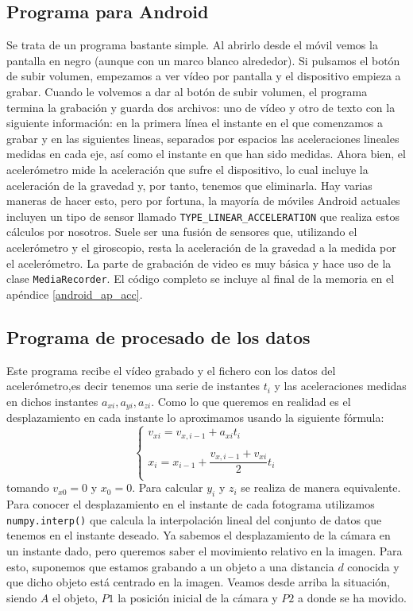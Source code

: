 \documentclass[a4paper,openright, 12pt]{book}
\begin{document}
\subsection{Programa para Android}
Se trata de un programa bastante simple. Al abrirlo desde el móvil vemos la pantalla en negro (aunque con un marco blanco alrededor). Si pulsamos el botón de subir volumen, empezamos a ver vídeo por pantalla y el dispositivo empieza a grabar. Cuando le volvemos a dar al botón de subir volumen, el programa termina la grabación y guarda dos archivos: uno de vídeo y otro de texto con la siguiente información: en la primera línea el instante en el que comenzamos a grabar y en las siguientes lineas, separados por espacios las aceleraciones lineales medidas en cada eje, así como el instante en que han sido medidas.
Ahora bien, el acelerómetro mide la aceleración que sufre el dispositivo, lo cual incluye la aceleración de la gravedad y, por tanto, tenemos que eliminarla. Hay varias maneras de hacer esto, pero por fortuna, la mayoría de móviles Android actuales incluyen un tipo de sensor llamado \lstinline|TYPE_LINEAR_ACCELERATION| que realiza estos cálculos por nosotros. Suele ser una fusión de sensores que, utilizando el acelerómetro y el giroscopio, resta la aceleración de la gravedad a la medida por el acelerómetro.
La parte de grabación de video es muy básica y hace uso de la clase \lstinline|MediaRecorder|.
El código completo se incluye al final de la memoria en el apéndice \ref{android_ap_acc}.
\newpage
\subsection{Programa de procesado de los datos}
Este programa recibe el vídeo grabado y el fichero con los datos del acelerómetro,es decir tenemos una serie de instantes $t_i$ y las aceleraciones medidas en dichos instantes $a_{xi}, a_{yi}, a_{zi}$.
Como lo que queremos en realidad es el desplazamiento en cada instante lo aproximamos usando la siguiente fórmula:
\begin{equation}
\left\{ \begin{array}{lcc}
             v_{xi} = v_{x,i-1} + a_{xi}t_i \\
             \\ x_i = x_{i-1} + \dfrac{v_{x,i-1} + v_{xi}}{2} t_i \\
             \end{array}
   \right.
\end{equation}
tomando $v_{x0}=0$ y $x_0=0$.
Para calcular $y_i$ y $z_i$ se realiza de manera equivalente.
\newline
Para conocer el desplazamiento en el instante de cada fotograma utilizamos \lstinline|numpy.interp()| que calcula la interpolación lineal del conjunto de datos que tenemos en el instante deseado. Ya sabemos el desplazamiento de la cámara en un instante dado, pero queremos saber el movimiento relativo en la imagen. Para esto, suponemos que estamos grabando a un objeto a una distancia $d$ conocida y que dicho objeto está centrado en la imagen.
Veamos desde arriba la situación, siendo $A$ el objeto, $P1$ la posición inicial de la cámara y $P2$ a donde se ha movido. 
\end{document}
